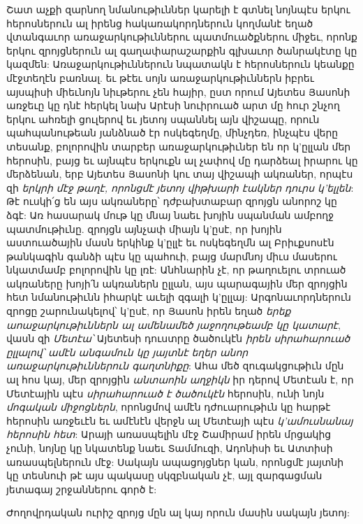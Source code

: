 \documentclass{article}
\begin{document}
{Շատ աչքի զարնող նմանութիւններ կարելի է գտնել նոյնպէս երկու հերոսներուն ալ իրենց հակառակորդներուն կողմանէ եղած վտանգաւոր առաջարկութիւններու պատմուածքներու միջեւ, որոնք երկու զրոյցներուն ալ գաղափարաշարքին գլխաւոր ծանրակէտը կը կազմեն: Առաջարկութիւններուն նպատակն է հերոսներուն կեանքը մէջտեղէն բառնալ. եւ թէեւ սոյն առաջարկութիւններն իբրեւ այսպիսի միեւնոյն նիւթերու չեն հայիր, ըստ որում Այետես Յասոնի առջեւը կը դնէ հերկել նախ Արէսի նուիրուած արտ մը հուր շնչող երկու ահռելի ցուլերով եւ յետոյ սպաննել այն վիշապը, որուն պահպանութեան յանձնած էր ոսկեգեղմը, մինչդեռ, ինչպէս վերը տեսանք, բոլորովին տարբեր առաջարկութիւներ են որ կ'ըլլան մեր հերոսին, բայց եւ այնպէս երկուքն ալ չափով մը դարձեալ իրարու կը մերձենան, երբ Այետես Յասոնի կու տայ վիշապի ակռաներ, որպէս զի \emph{երկրի մէջ թաղէ, որոնցմէ յետոյ վիթխարի էակներ դուրս կ'ելլեն}: Թէ ուսկի՛ց են այս ակռաները՝ դժբախտաբար զրոյցն անորոշ կը ձգէ: Առ հասարակ մութ կը մնայ նաեւ խոյին սպանման ամբողջ պատմութիւնը. զրոյցն այնչափ միայն կ'ըսէ, որ խոյին աստուածային մասն երկինք կ'ըլլէ եւ ոսկեգեղմն ալ Բրիւքսոսէն թանկագին գանձի պէս կը պահուի, բայց մարմնոյ միւս մասերու նկատմամբ բոլորովին կը լռէ: Անհնարին չէ, որ թաղուելու տրուած ակռաները խոյի՛ն ակռաներն ըլլան, այս պարագային մեր զրոյցին հետ նմանութիւնն իհարկէ աւելի զգալի կ'ըլլայ: Արգոնաւորդներուն զրոցը շարունակելով՝ կ'ըսէ, որ Յասոն իրեն եղած \emph{երեք աոաջարկութիւններն ալ ամենամեծ յաջողութեամբ կը կատարէ}, վասն զի \emph{Մետէա՝} Այետեսի դուստրը ծածուկէն \emph{իրեն սիրահարուած ըլլալով՝ ամէն անգամուն կը յայտնէ եղեր անոր առաջարկութիւններուն գաղտնիքը}: Ահա մեծ զուգակցութիւն մըն ալ հոս կայ, մեր զրոյցին \emph{անտաոին աղջիկն} իր դերով Մետէան է, որ Մետէային պէս \emph{սիրահարուած է ծածուկէն} հերոսին, ունի նոյն \emph{մոգական միջոցներն}, որոնցմով ամէն դժուարութիւն կը հարթէ հերոսին առջեւէն եւ ամէնէն վերջն ալ Մետէայի պէս \emph{կ'ամուսնանայ հերոսին հետ}: Արայի առասպելին մէջ Շամիրամ իրեն մրցակից չունի, նոյնը կը նկատենք նաեւ Տամմուզի, Ադոնիսի եւ Ատտիսի առասպելներուն մէջ: Սակայն ապացոյցներ կան, որոնցմէ յայտնի կը տեսնուի թէ այս պակասը սկզբնական չէ, այլ զարգացման յետագայ շրջաններու գործ է:

Ժողովրդական ուրիշ զրոյց մըն ալ կայ որուն մասին սակայն յետոյ:}
\clearpage
\subsection{}
\end{document}
